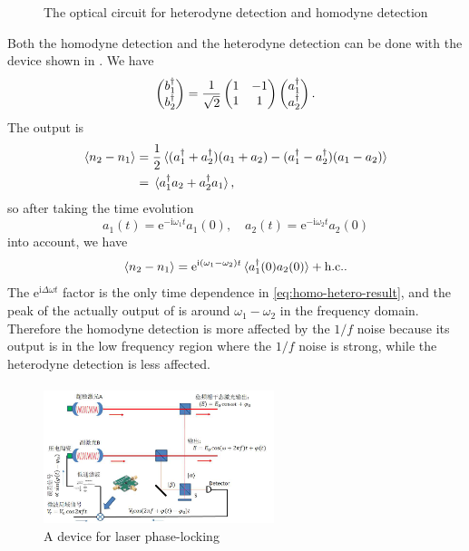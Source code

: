 \documentclass[hyperref, a4paper]{article}
\newcommand*{\ii}{\mathrm{i}}
\newcommand*{\ee}{\mathrm{e}}
\begin{document}
\begin{figure}
    \centering
    
    \caption{The optical circuit for heterodyne detection and homodyne detection}
    \label{fig:hom-hetero-device}
\end{figure}

Both the homodyne detection and the heterodyne detection can be done with the device shown in .
We have 
\[
    \pmqty{b_1^\dagger \\ b_2^\dagger} = \frac{1}{\sqrt{2}} \pmqty{1 & -1 \\ 1 & 1 } \pmqty{a^\dagger_1 \\ a_2^\dagger}.
\]
The output is 
\[
    \begin{aligned}
        \expval{n_2 - n_1} &= \frac{1}{2} \expval*{(a_1^\dagger + a_2^\dagger) (a_1 + a_2) - (a_1^\dagger - a_2^\dagger) (a_1 - a_2)} \\
        &= \expval*{a^\dagger_1 a_2 + a^\dagger_2 a_1},
    \end{aligned}
\]
so after taking the time evolution 
\[
    a_1(t) = \ee^{- \ii \omega_1 t} a_1(0), \quad a_2(t) = \ee^{- \ii \omega_2 t} a_2(0) 
\] 
into account, we have 
\begin{equation}
    \expval{n_2 - n_1} = \ee^{\ii (\omega_1 - \omega_2) t} \expval*{a_1^\dagger(0) a_2(0)} + \text{h.c.}.
    \label{eq:homo-hetero-result}
\end{equation}
The $\ee^{\ii \Delta \omega t}$ factor is the only time dependence in \eqref{eq:homo-hetero-result}, and the peak of the actually output of  is around $\omega_1 - \omega_2$ in the frequency domain.
Therefore the homodyne detection is more affected by the $1/f$ noise because its output is in the low frequency region where the $1/f$ noise is strong, while the heterodyne detection is less affected.

\paragraph{} 

\begin{figure}
    \centering
    \includegraphics[width=0.6\textwidth]{phase-locking.png}
    \caption{A device for laser phase-locking}
    \label{fig:phase-locking}
\end{figure}
\end{document}
